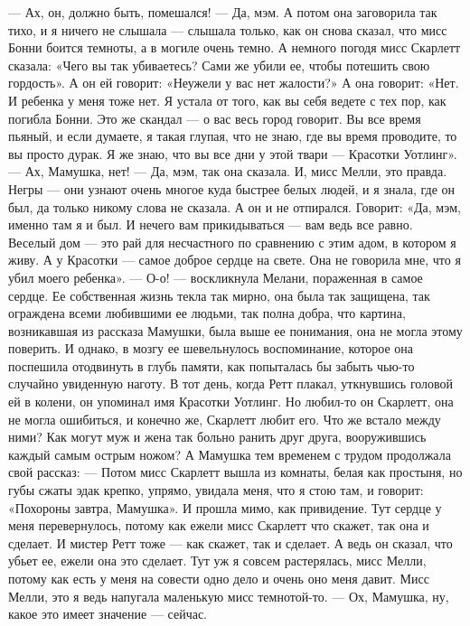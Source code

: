 — Ах, он, должно быть, помешался!
— Да, мэм. А потом она заговорила так тихо, и я ничего не слышала — слышала только, как он снова сказал, что мисс Бонни боится темноты, а в могиле очень темно. А немного погодя мисс Скарлетт сказала: «Чего вы так убиваетесь? Сами же убили ее, чтобы потешить свою гордость». А он ей говорит: «Неужели у вас нет жалости?» А она говорит: «Нет. И ребенка у меня тоже нет. Я устала от того, как вы себя ведете с тех пор, как погибла Бонни. Это же скандал — о вас весь город говорит. Вы все время пьяный, и если думаете, я такая глупая, что не знаю, где вы время проводите, то вы просто дурак. Я же знаю, что вы все дни у этой твари — Красотки Уотлинг».
— Ах, Мамушка, нет!
— Да, мэм, так она сказала. И, мисс Мелли, это правда. Негры — они узнают очень многое куда быстрее белых людей, и я знала, где он был, да только никому слова не сказала. А он и не отпирался. Говорит: «Да, мэм, именно там я и был. И нечего вам прикидываться — вам ведь все равно. Веселый дом — это рай для несчастного по сравнению с этим адом, в котором я живу. А у Красотки — самое доброе сердце на свете. Она не говорила мне, что я убил моего ребенка».
— О-о! — воскликнула Мелани, пораженная в самое сердце. Ее собственная жизнь текла так мирно, она была так защищена, так ограждена всеми любившими ее людьми, так полна добра, что картина, возникавшая из рассказа Мамушки, была выше ее понимания, она не могла этому поверить. И однако, в мозгу ее шевельнулось воспоминание, которое она поспешила отодвинуть в глубь памяти, как попыталась бы забыть чью-то случайно увиденную наготу. В тот день, когда Ретт плакал, уткнувшись головой ей в колени, он упоминал имя Красотки Уотлинг. Но любил-то он Скарлетт, она не могла ошибиться, и конечно же, Скарлетт любит его. Что же встало между ними? Как могут муж и жена так больно ранить друг друга, вооружившись каждый самым острым ножом?
А Мамушка тем временем с трудом продолжала свой рассказ:
— Потом мисс Скарлетт вышла из комнаты, белая как простыня, но губы сжаты эдак крепко, упрямо, увидала меня, что я стою там, и говорит: «Похороны завтра, Мамушка». И прошла мимо, как привидение. Тут сердце у меня перевернулось, потому как ежели мисс Скарлетт что скажет, так она и сделает. И мистер Ретт тоже — как скажет, так и сделает. А ведь он сказал, что убьет ее, ежели она это сделает. Тут уж я совсем растерялась, мисс Мелли, потому как есть у меня на совести одно дело и очень оно меня давит. Мисс Мелли, это я ведь напугала маленькую мисс темнотой-то.
— Ох, Мамушка, ну, какое это имеет значение — сейчас.

